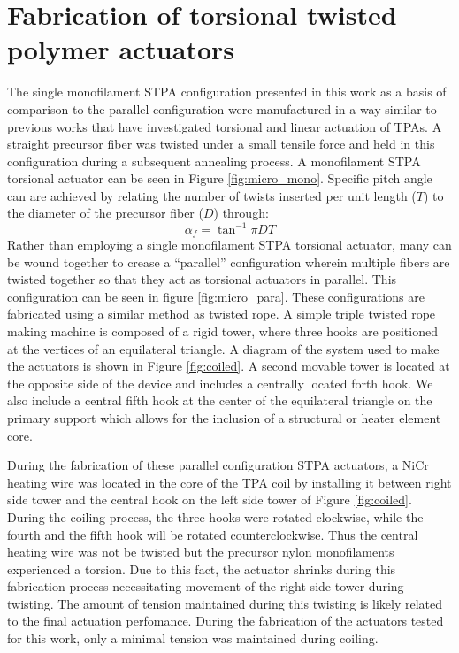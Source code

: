 \documentclass[twocolumn,10pt]{asme2e}
\begin{document}
\section{Fabrication of torsional twisted polymer actuators}
The single monofilament STPA configuration presented in this work as a basis of comparison to the parallel configuration were manufactured in a way similar to previous works that have investigated torsional and linear actuation of TPAs. A straight precursor fiber was twisted under a small tensile force and held in this configuration during a subsequent annealing process. A monofilament STPA torsional actuator can be seen in Figure \ref{fig:micro_mono}. Specific pitch angle can are achieved by relating the number of twists inserted per unit length ($T$) to the diameter of the precursor fiber ($D$) through:
\begin{equation}
\alpha_f = \tan^{-1}{\pi D T}
\end{equation}
Rather than employing a single monofilament STPA torsional actuator, many can be wound together to crease a ``parallel'' configuration wherein multiple fibers are twisted together so that they act as torsional actuators in parallel. This configuration can be seen in figure \ref{fig:micro_para}. These configurations  are fabricated using a similar method as twisted rope. A simple triple twisted rope making machine is composed of a rigid tower, where three hooks are positioned at the vertices of an equilateral triangle. A diagram of the system used to make the actuators is shown in Figure \ref{fig:coiled}. A second movable tower is located at the opposite side of the device and includes a centrally located forth hook. We also include a central fifth hook at the center of the equilateral triangle on the primary support which allows for the inclusion of a structural or heater element core. 

During the fabrication of these parallel configuration STPA actuators, a NiCr heating wire was located in the core of the TPA coil by installing it between right side tower and the central hook on the left side tower of Figure \ref{fig:coiled}. During the coiling process, the three hooks were rotated clockwise, while the fourth and the fifth hook will be rotated counterclockwise. Thus the central heating wire was not be twisted but the precursor nylon monofilaments experienced a torsion. Due to this fact, the actuator shrinks during this fabrication process necessitating movement of the right side tower during twisting. The amount of tension maintained during this twisting is likely related to the final actuation perfomance. During the fabrication of the actuators tested for this work, only a minimal tension was maintained during coiling. 
\end{document}
